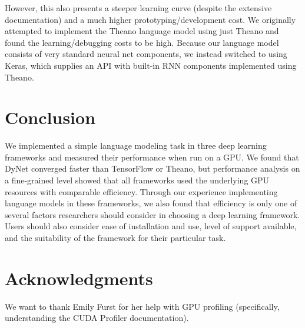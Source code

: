 \documentclass{article}
\begin{document}
However, this also presents a steeper learning curve (despite the extensive documentation) and a much higher prototyping/development cost. We originally attempted to implement the Theano language model using just Theano and found the learning/debugging costs to be high. Because our language model consists of very standard neural net components, we instead switched to using Keras, which supplies an API with built-in RNN components implemented using Theano.


\section{Conclusion}
We implemented a simple language modeling task in three deep learning frameworks and measured their performance when run on a GPU. We found that DyNet converged faster than TensorFlow or Theano, but performance analysis on a fine-grained level showed that all frameworks used the underlying GPU resources with comparable efficiency. Through our experience implementing language models in these frameworks, we also found that efficiency is only one of several factors researchers should consider in choosing a deep learning framework. Users should also consider ease of installation and use, level of support available, and the suitability of the framework for their particular task.

\section*{Acknowledgments}
We want to thank Emily Furst for her help with GPU profiling (specifically, understanding the CUDA Profiler documentation).
\newpage


\end{document}
